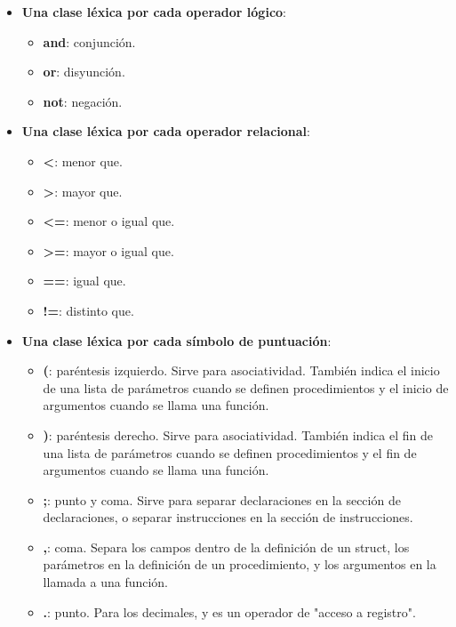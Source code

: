 \documentclass[11pt]{article}
\begin{document}
\begin{itemize}
            \item \textbf{Una clase léxica por cada operador lógico}:
            \begin{itemize}
                \item \textbf{and}: conjunción.
                \item \textbf{or}: disyunción.
                \item \textbf{not}: negación.
            \end{itemize}
            \item \textbf{Una clase léxica por cada operador relacional}:
            \begin{itemize}
                \item \textbf{\textless}: menor que.
                \item \textbf{\textgreater}: mayor que.
                \item \textbf{\textless=}: menor o igual que.
                \item \textbf{\textgreater=}: mayor o igual que.
                \item \textbf{==}: igual que.
                \item \textbf{!=}: distinto que.
            \end{itemize}
            \item \textbf{Una clase léxica por cada símbolo de puntuación}:
            \begin{itemize}
                \item \textbf{(}: paréntesis izquierdo. Sirve para asociatividad. También indica el inicio de una lista de parámetros cuando se definen procedimientos y el inicio de argumentos cuando se llama una función.
                \item \textbf{)}: paréntesis derecho. Sirve para asociatividad. También indica el fin de una lista de parámetros cuando se definen procedimientos y el fin de argumentos cuando se llama una función.
                \item \textbf{;}: punto y coma. Sirve para separar declaraciones en la sección de declaraciones, o separar instrucciones en la sección de instrucciones.
                \item \textbf{,}: coma. Separa los campos dentro de la definición de un struct, los parámetros en la definición de un procedimiento, y los argumentos en la llamada a una función.
                \item \textbf{.}: punto. Para los decimales, y es un operador de "acceso a registro".

\end{itemize}
\end{itemize}
\end{document}
